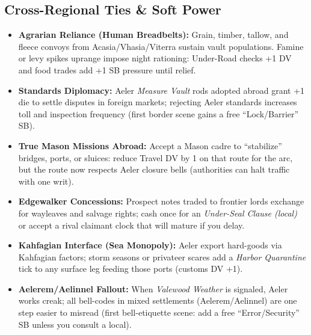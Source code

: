 \subsection*{Cross-Regional Ties \& Soft Power}
\begin{itemize}
  \item \textbf{Agrarian Reliance (Human Breadbelts):} Grain, timber, tallow, and fleece convoys from Acasia/Vhasia/Viterra sustain vault populations. Famine or levy spikes uprange impose night rationing: Under-Road checks +1 DV and food trades add +1 SB pressure until relief.
  \item \textbf{Standards Diplomacy:} Aeler \emph{Measure Vault} rods adopted abroad grant +1 die to settle disputes in foreign markets; rejecting Aeler standards increases toll and inspection frequency (first border scene gains a free “Lock/Barrier” SB).
  \item \textbf{True Mason Missions Abroad:} Accept a Mason cadre to “stabilize” bridges, ports, or sluices: reduce Travel DV by 1 on that route for the arc, but the route now respects Aeler closure bells (authorities can halt traffic with one writ).
  \item \textbf{Edgewalker Concessions:} Prospect notes traded to frontier lords exchange for wayleaves and salvage rights; cash once for an \emph{Under-Seal Clause (local)} or accept a rival claimant clock that will mature if you delay.
  \item \textbf{Kahfagian Interface (Sea Monopoly):} Aeler export hard-goods via Kahfagian factors; storm seasons or privateer scares add a \emph{Harbor Quarantine} tick to any surface leg feeding those ports (customs DV +1).
  \item \textbf{Aelerem/Aelinnel Fallout:} When \emph{Valewood Weather} is signaled, Aeler works creak; all bell-codes in mixed settlements (Aelerem/Aelinnel) are one step easier to misread (first bell-etiquette scene: add a free “Error/Security” SB unless you consult a local).
\end{itemize}

